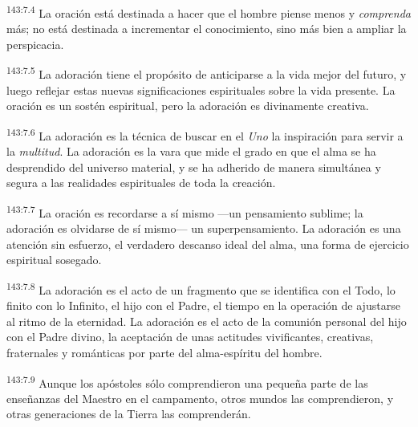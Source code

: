 \par
\textsuperscript{143:7.4} La oración está destinada a hacer que el hombre piense menos y \textit{comprenda} más; no está destinada a incrementar el conocimiento, sino más bien a ampliar la perspicacia.

\par
\textsuperscript{143:7.5} La adoración tiene el propósito de anticiparse a la vida mejor del futuro, y luego reflejar estas nuevas significaciones espirituales sobre la vida presente. La oración es un sostén espiritual, pero la adoración es divinamente creativa.

\par
\textsuperscript{143:7.6} La adoración es la técnica de buscar en el \textit{Uno} la inspiración para servir a la \textit{multitud}. La adoración es la vara que mide el grado en que el alma se ha desprendido del universo material, y se ha adherido de manera simultánea y segura a las realidades espirituales de toda la creación.

\par
\textsuperscript{143:7.7} La oración es recordarse a sí mismo ---un pensamiento sublime; la adoración es olvidarse de sí mismo--- un superpensamiento. La adoración es una atención sin esfuerzo, el verdadero descanso ideal del alma, una forma de ejercicio espiritual sosegado.

\par
\textsuperscript{143:7.8} La adoración es el acto de un fragmento que se identifica con el Todo, lo finito con lo Infinito, el hijo con el Padre, el tiempo en la operación de ajustarse al ritmo de la eternidad. La adoración es el acto de la comunión personal del hijo con el Padre divino, la aceptación de unas actitudes vivificantes, creativas, fraternales y románticas por parte del alma-espíritu del hombre.

\par
\textsuperscript{143:7.9} Aunque los apóstoles sólo comprendieron una pequeña parte de las enseñanzas del Maestro en el campamento, otros mundos las comprendieron, y otras generaciones de la Tierra las comprenderán.